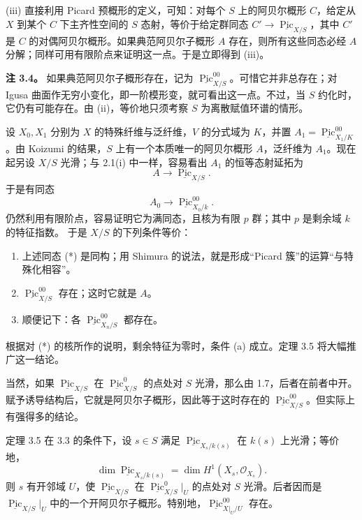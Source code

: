 (iii) 直接利用 Picard 预概形的定义，可知：对每个 $S$ 上的阿贝尔概形 $C$，给定从 $X$ 到某个 $C$ 下主齐性空间的 $S$ 态射，等价于给定群同态 $C'\to\underline{\operatorname{Pic}}_{X/S}$，其中 $C'$ 是 $C$ 的对偶阿贝尔概形。如果典范阿贝尔子概形 $A$ 存在，则所有这些同态必经 $A$ 分解；同样可用有限阶点来证明这一点。于是立即得到 (iii)。

\textbf{注 3.4。} 如果典范阿贝尔子概形存在，记为 $\underline{\operatorname{Pic}}^{00}_{X/S}$。可惜它并非总存在；对 Igusa 曲面作无穷小变化，即一阶模形变，就可看出这一点。不过，当 $S$ 约化时，它仍有可能存在。由 (ii)，等价地只须考察 $S$ 为离散赋值环谱的情形。

设 $X_0,X_1$ 分别为 $X$ 的特殊纤维与泛纤维，$V$ 的分式域为 $K$，并置 $A_1=\underline{\operatorname{Pic}}^{00}_{X_1/K}$。由 Koizumi 的结果，$S$ 上有一个本质唯一的阿贝尔概形 $A$，泛纤维为 $A_1$。现在起另设 $X/S$ 光滑；与 2.1(i) 中一样，容易看出 $A_1$ 的恒等态射延拓为
\[
 A\longrightarrow\underline{\operatorname{Pic}}_{X/S}.
\]
于是有同态
\begin{equation}\label{pp-canonical-specialization}
 A_0\longrightarrow\underline{\operatorname{Pic}}^{00}_{X_0/k}.\tag{*}
\end{equation}
仍然利用有限阶点，容易证明它为满同态，且核为有限 $p$ 群；其中 $p$ 是剩余域 $k$ 的特征指数。
于是 $X/S$ 的下列条件等价：
\begin{enumerate}
\item[a.] 上述同态 (*) 是同构；用 Shimura 的说法，就是形成“Picard 簇”的运算“与特殊化相容”。
\item[b.] $\underline{\operatorname{Pic}}^{00}_{X/S}$ 存在；这时它就是 $A$。
\item[c.] 顺便记下：各 $\underline{\operatorname{Pic}}^{00}_{X_n/S}$ 都存在。
\end{enumerate}
根据对 (*) 的核所作的说明，剩余特征为零时，条件 (a) 成立。定理 3.5 将大幅推广这一结论。

当然，如果 $\underline{\operatorname{Pic}}_{X/S}$ 在 $\underline{\operatorname{Pic}}^0_{X/S}$ 的点处对 $S$ 光滑，那么由 1.7，后者在前者中开。赋予诱导结构后，它就是阿贝尔子概形，因此等于这时存在的 $\underline{\operatorname{Pic}}^{00}_{X/S}$。但实际上有强得多的结论。

\begin{statement}{定理 3.5}
在 3.3 的条件下，设 $s\in S$ 满足 $\underline{\operatorname{Pic}}_{X_s/k(s)}$ 在 $k(s)$ 上光滑；等价地，
\[
 \dim\underline{\operatorname{Pic}}_{X_s/k(s)}
 =\dim H^1(X_s,\mathcal O_{X_s}).
\]
则 $s$ 有开邻域 $U$，使 $\underline{\operatorname{Pic}}_{X/S}$ 在 $\underline{\operatorname{Pic}}^0_{X/S}|_U$ 的点处对 $S$ 光滑。后者因而是 $\underline{\operatorname{Pic}}_{X/S}|_U$ 中的一个开阿贝尔子概形。特别地，$\underline{\operatorname{Pic}}^{00}_{X|_U/U}$ 存在。
\end{statement}

